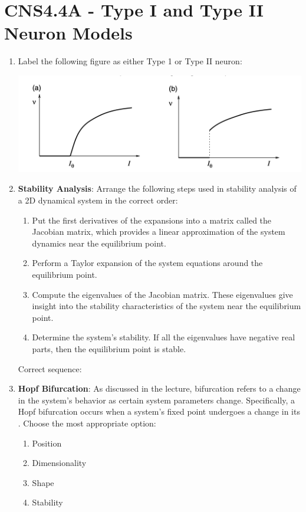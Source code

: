 \documentclass[11pt,letterpaper]{article}
\begin{document}
\section{CNS4.4A - Type I and Type II Neuron Models}
\begin{enumerate}
    \item Label the following figure as either Type 1 or Type II neuron:
    \begin{center}
        \includegraphics[scale=0.7]{4.1.png}
    \end{center}

    \item \textbf{Stability Analysis}: Arrange the following steps used in stability analysis of a 2D dynamical system in the correct order:
    \begin{enumerate}
        \item Put the first derivatives of the expansions into a matrix called the Jacobian matrix, which provides a linear approximation of the system dynamics near the equilibrium point.
        \item Perform a Taylor expansion of the system equations around the equilibrium point.
        \item Compute the eigenvalues of the Jacobian matrix. These eigenvalues give insight into the stability characteristics of the system near the equilibrium point.
        \item Determine the system's stability. If all the eigenvalues have negative real parts, then the equilibrium point is stable.
    \end{enumerate}
    \vspace{0.5 cm}
    Correct sequence: \underline{\hspace{6 cm}}
    \vspace{0.5 cm}

    \item \textbf{Hopf Bifurcation}: As discussed in the lecture, bifurcation refers to a change in the system's behavior as certain system parameters change. Specifically, a Hopf bifurcation occurs when a system's fixed point undergoes a change in its \underline{\hspace{2 cm}}. Choose the most appropriate option:
    \begin{enumerate}
        \item Position
        \item Dimensionality
        \item Shape
        \item Stability
    \end{enumerate}


\end{enumerate}
\end{document}
